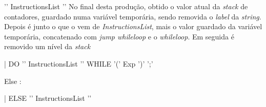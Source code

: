 '{' InstructionsList '}'  
No final desta produção, obtido o valor atual da \emph{stack} de contadores,
guardado numa variável temporária, sendo removida o \emph{label} da
\emph{string}. Depois é junto o que o vem de \emph{InstructionsList}, mais
o valor guardado da variável temporária, concatenado com \emph{jump whileloop}
e o \emph{whileloop}. Em seguida é removido um nível da \emph{stack}       


| DO '{' InstructionsList '}' WHILE '(' Exp ')' ';' 

Else :         


|            
ELSE '{' InstructionsList '}'          








